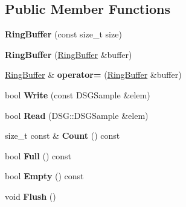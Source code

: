 \subsection*{Public Member Functions}
\begin{DoxyCompactItemize}
\item 
\hypertarget{class_d_s_g_1_1_ring_buffer_ae9859fd3ad18961de494d8b50fe4763e}{{\bfseries Ring\+Buffer} (const size\+\_\+t size)}\label{class_d_s_g_1_1_ring_buffer_ae9859fd3ad18961de494d8b50fe4763e}

\item 
\hypertarget{class_d_s_g_1_1_ring_buffer_ab09f32dacee49df3281c6701b7a4d737}{{\bfseries Ring\+Buffer} (\hyperlink{class_d_s_g_1_1_ring_buffer}{Ring\+Buffer} \&buffer)}\label{class_d_s_g_1_1_ring_buffer_ab09f32dacee49df3281c6701b7a4d737}

\item 
\hypertarget{class_d_s_g_1_1_ring_buffer_a892fbcc12b2dca5b04ead96a09299e73}{\hyperlink{class_d_s_g_1_1_ring_buffer}{Ring\+Buffer} \& {\bfseries operator=} (\hyperlink{class_d_s_g_1_1_ring_buffer}{Ring\+Buffer} \&buffer)}\label{class_d_s_g_1_1_ring_buffer_a892fbcc12b2dca5b04ead96a09299e73}

\item 
\hypertarget{class_d_s_g_1_1_ring_buffer_aa5dd2caa0a270173251faee40a43d692}{bool {\bfseries Write} (const D\+S\+G\+Sample \&elem)}\label{class_d_s_g_1_1_ring_buffer_aa5dd2caa0a270173251faee40a43d692}

\item 
\hypertarget{class_d_s_g_1_1_ring_buffer_a6b2848a64f15c7b0c320779582fa0fbe}{bool {\bfseries Read} (D\+S\+G\+::\+D\+S\+G\+Sample \&elem)}\label{class_d_s_g_1_1_ring_buffer_a6b2848a64f15c7b0c320779582fa0fbe}

\item 
\hypertarget{class_d_s_g_1_1_ring_buffer_a9bd79b0a6dff618b205e396c101ee070}{size\+\_\+t const \& {\bfseries Count} () const }\label{class_d_s_g_1_1_ring_buffer_a9bd79b0a6dff618b205e396c101ee070}

\item 
\hypertarget{class_d_s_g_1_1_ring_buffer_a53ddb04ffcbb5470a8d2b0a3c65b70cb}{bool {\bfseries Full} () const }\label{class_d_s_g_1_1_ring_buffer_a53ddb04ffcbb5470a8d2b0a3c65b70cb}

\item 
\hypertarget{class_d_s_g_1_1_ring_buffer_ac1346f5842d08b988a5297abe4089b96}{bool {\bfseries Empty} () const }\label{class_d_s_g_1_1_ring_buffer_ac1346f5842d08b988a5297abe4089b96}

\item 
\hypertarget{class_d_s_g_1_1_ring_buffer_ab23c8003d2857809a816068eeb209d60}{void {\bfseries Flush} ()}\label{class_d_s_g_1_1_ring_buffer_ab23c8003d2857809a816068eeb209d60}

\end{DoxyCompactItemize}
